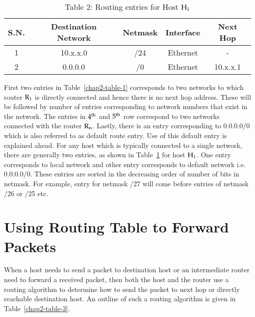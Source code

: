 \begin{multicols}{2}
\begin{table}[H]
\caption{Table 2: Routing entries for Host $\rm{H}_{1}$}\label{chap2-table-2}
\begin{tabular}{|c|c|c|c|c|}
\hline
\textbf{S.N.} & \textbf{Destination Network} & \textbf{Netmask} & \textbf{Interface} & \textbf{Next Hop}\\
\hline
1 & 10.x.x.0 & /24 & Ethernet & -\\
\hline
2 & 0.0.0.0 & /0 & Ethernet & 10.x.x.1\\
\hline
\end{tabular}
\end{table}

First two entries in Table~\ref{chap2-table-1} corresponds to two networks to which router $\rm{R}_{1}$ is directly connected and hence there is no next hop address. These will be followed by number of entries corresponding to network numbers that exist in the network. The entries in $4^{\rm th}$ and $5^{\rm th}$ row correspond to two networks connected with the router $\rm{R}_{n}$. Lastly, there is an entry corresponding to 0.0.0.0/0 which is also referred to as default route entry. Use of this default entry is explained ahead. For any host which is typically connected to a single network, there are generally two entries, as shown in Table~\ref{chap2-table-2} for host $\rm {H}_{1}$. One entry corresponds to local network and other entry corresponds to default network i.e. 0.0.0.0/0. These entries are sorted in the decreasing order of number of bits in netmask. For example, entry for netmask /27 will come before entries of netmask /26 or /25 etc.

\section{Using Routing Table to Forward Packets}\label{chap2-sec2}

When a host needs to send a packet to destination host or an intermediate router need to forward a received packet, then both the host and the router use a routing algorithm to determine how to send the packet to next hop or directly reachable destination host. An outline of such a routing algorithm is given in Table~\ref{chap2-table-3}. 


\end{multicols}
